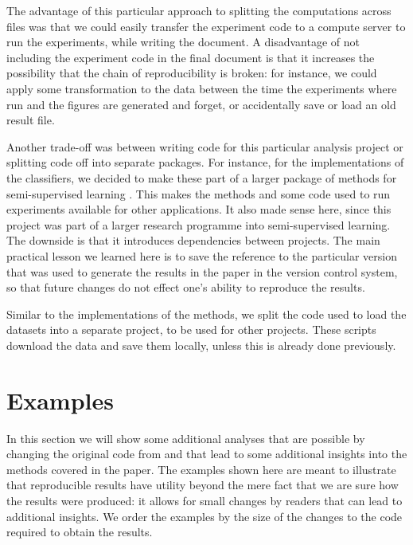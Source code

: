 \documentclass[runningheads,a4paper]{llncs}\usepackage[]{graphicx}\usepackage[]{color}
\begin{document}
The advantage of this particular approach to splitting the computations across files was that we could easily transfer the experiment code to a compute server to run the experiments, while writing the document. A disadvantage of not including the experiment code in the final document is that it increases the possibility that the chain of reproducibility is broken: for instance, we could apply some transformation to the data between the time the experiments where run and the figures are generated and forget, or accidentally save or load an old result file.

Another trade-off was between writing code for this particular analysis project or splitting code off into separate packages. For instance, for the implementations of the classifiers, we decided to make these part of a larger package of methods for semi-supervised learning \cite{RSSL}. This makes the methods and some code used to run experiments available for other applications. It also made sense here, since this project was part of a larger research programme into semi-supervised learning. The downside is that it introduces dependencies between projects. The main practical lesson we learned here is to save the reference to the particular version that was used to generate the results in the paper in the version control system, so that future changes do not effect one's ability to reproduce the results.

Similar to the implementations of the methods, we split the code used to load the datasets into a separate project, to be used for other projects. These scripts download the data and save them locally, unless this is already done previously.

\section{Examples}
\label{section:exampleperformance}
In this section we will show some additional analyses that are possible by changing the original code from \cite{Krijthe2016a} and that lead to some additional insights into the methods covered in the paper. The examples shown here are meant to illustrate that reproducible results have utility beyond the mere fact that we are sure how the results were produced: it allows for small changes by readers that can lead to additional insights. We order the examples by the size of the changes to the code required to obtain the results.
\end{document}
